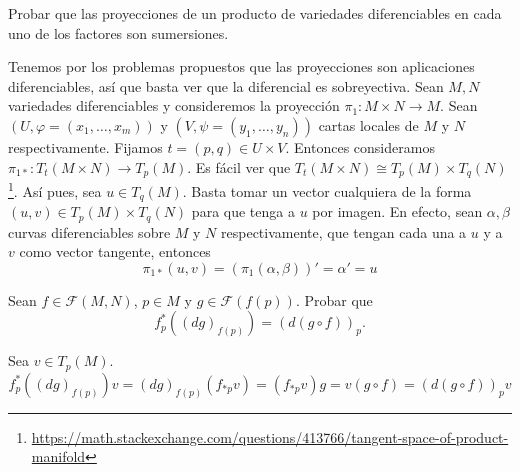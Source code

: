 \documentclass[twoside]{article}
\newcounter{ejercicio}
\begin{document}
\newpage
\begin{ejercicio}{4}
Probar que las proyecciones de un producto de variedades diferenciables en
cada uno de los factores son sumersiones.
\end{ejercicio}
\begin{solucion}
Tenemos por los problemas propuestos que las proyecciones son aplicaciones diferenciables, así que basta ver que la diferencial es sobreyectiva. Sean $M,N$ variedades diferenciables y consideremos la proyección $\pi_1:M\times N\to M$. Sean $(U,\varphi=(x_1,\dots, x_m))$ y $(V,\psi=(y_1,\dots,y_n))$ cartas locales de $M$ y $N$ respectivamente. Fijamos $t=(p,q)\in U\times V$. Entonces consideramos $\pi_{1*}:T_t(M\times N)\to T_p(M)$. Es fácil ver que $T_t(M\times N)\cong T_p(M)\times T_q(N)$\footnote{\url{https://math.stackexchange.com/questions/413766/tangent-space-of-product-manifold}}. Así pues, sea $u\in T_q(M)$. Basta tomar un vector cualquiera de la forma $(u,v)\in T_p(M)\times T_q(N)$ para que tenga a $u$ por imagen. En efecto, sean $\alpha,\beta
$ curvas diferenciables sobre $M$ y $N$ respectivamente, que tengan cada una a $u$ y a $v$ como vector tangente, entonces
$$\pi_{1*}(u,v)=(\pi_1(\alpha,\beta))'=\alpha'=u$$
\end{solucion}

\newpage

\begin{ejercicio}{5}\label{1}
Sean $f\in\mathcal{F}(M,N)$, $p\in M$ y $g\in\mathcal{F}(f(p))$. Probar que $$f^*_p((dg)_{f(p)})=(d(g\circ f))_p.$$
\end{ejercicio}
\begin{solucion}
Sea $v\in T_p(M)$. 
$$f^*_p((dg)_{f(p)})v=(dg)_{f(p)}(f_{*p}v)=(f_{*p}v)g=v(g\circ f)=(d(g\circ f))_pv$$
\end{solucion}

\newpage
\end{document}
